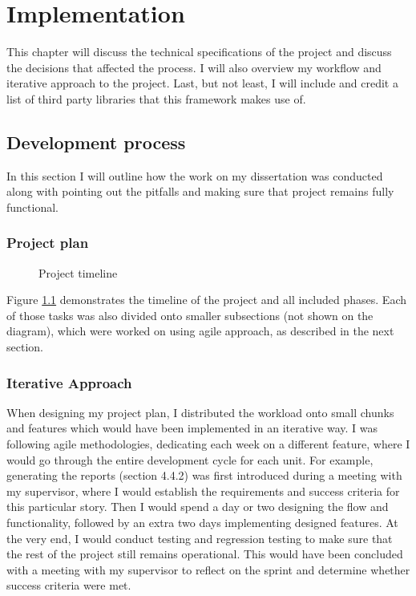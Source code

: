 \chapter{Implementation\label{chap:implementation}}
This chapter will discuss the technical specifications of the project and discuss the decisions that affected the process. I will also overview my workflow and iterative approach to the project. Last, but not least, I will include and credit a list of third party libraries that this framework makes use of.

\section{Development process}

In this section I will outline how the work on my dissertation was conducted along with pointing out the pitfalls and making sure that project remains fully functional.

\subsection{Project plan}

\begin{figure}[h]
    \centering
    \caption{Project timeline}
    \label{fig:timeline}
\end{figure}

Figure \ref{fig:timeline} demonstrates the timeline of the project and all included phases. Each of those tasks was also divided onto smaller subsections (not shown on the diagram), which were worked on using agile approach, as described in the next section.

\subsection{Iterative Approach}

When designing my project plan, I distributed the workload onto small chunks and features which would have been implemented in an iterative way. I was following agile methodologies, dedicating each week on a different feature, where I would go through the entire development cycle for each unit. For example, generating the reports (section 4.4.2) was first introduced during a meeting with my supervisor, where I would establish the requirements and success criteria for this particular story. Then I would spend a day or two designing the flow and functionality, followed by an extra two days implementing designed features. At the very end, I would conduct testing and regression testing to make sure that the rest of the project still remains operational. This would have been concluded with a meeting with my supervisor to reflect on the sprint and determine whether success criteria were met.


